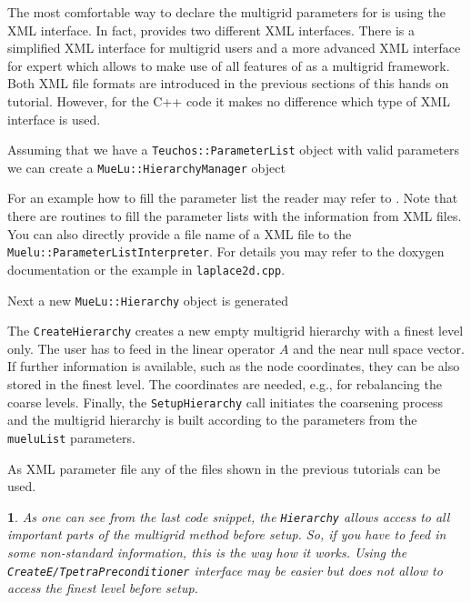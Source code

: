 \documentclass[10pt,fleqn]{book}
\newtheorem*{mycomment}{\ding{42}}
\providecommand\printCppListing[1]{

}
\begin{document}
The most comfortable way to declare the multigrid parameters for \muelu is using the XML interface. In fact, \muelu provides two different XML interfaces. There is a simplified XML interface for multigrid users and a more advanced XML interface for expert which allows to make use of all features of \muelu as a multigrid framework. Both XML file formats are introduced in the previous sections of this hands on tutorial.
However, for the C++ code it makes no difference which type of XML interface is used.

Assuming that we have a \texttt{Teuchos::ParameterList} object with valid \muelu parameters we can create a \texttt{MueLu::HierarchyManager} object
\printCppListing{ScalingTestParamList.cpp_2.fragment}
For an example how to fill the parameter list the reader may refer to \cite[Section 2.3]{Mue}. Note that there are routines to fill the parameter lists with the information from XML files. You can also directly provide a file name of a XML file to the \texttt{Muelu::ParameterListInterpreter}. For details you may refer to the doxygen documentation or the example in \texttt{laplace2d.cpp}.

Next a new \texttt{MueLu::Hierarchy} object is generated
\printCppListing{ScalingTestParamList.cpp_4.fragment}
The \texttt{CreateHierarchy} creates a new empty multigrid hierarchy with a finest level only. The user has to feed in the linear operator $A$ and the near null space vector. If further information is available, such as the node coordinates, they can be also stored in the finest level. The coordinates are needed, e.g., for rebalancing the coarse levels.
Finally, the \texttt{SetupHierarchy} call initiates the coarsening process and the multigrid hierarchy is built according to the parameters from the \texttt{mueluList} parameters.
\printCppListing{ScalingTestParamList.cpp_6.fragment}

As XML parameter file any of the files shown in the previous tutorials can be used.

\begin{mycomment}
As one can see from the last code snippet, the \texttt{Hierarchy} allows access to all important parts of the multigrid method before setup. So, if you have to feed in some non-standard information, this is the way how it works. Using the \texttt{CreateE/TpetraPreconditioner} interface may be easier but does not allow to access the finest level before setup.
\end{mycomment}
\end{document}
